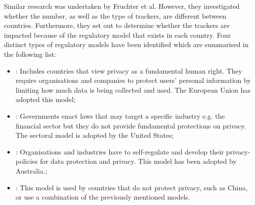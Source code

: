 \documentclass[../main.tex]{subfiles}
\begin{document}
Similar research was undertaken by Fruchter et al. \cite{fruchter2015variations} However, they investigated whether the number, as well as the type of trackers, are different between countries. Furthermore, they set out to determine whether the trackers are impacted because of the regulatory model that exists in each country. Four distinct types of regulatory models have been identified which are summarised in the following list:

\begin{itemize}
    \item {}: Includes countries that view privacy as a fundamental human right. They require organisations and companies to protect users’ personal information by limiting how much data is being collected and used. The European Union has adopted this model;
    \item {}: Governments enact laws that may target a specific industry e.g. the financial sector but they do not provide fundamental protections on privacy. The sectoral model is adopted by the United States;
    \item {}: Organisations and industries have to self-regulate and develop their privacy-policies for data protection and privacy. This model has been adopted by Australia.;
    \item {}: This model is used by countries that do not protect privacy, such as China, or use a combination of the previously mentioned models.
\end{itemize}
\end{document}
